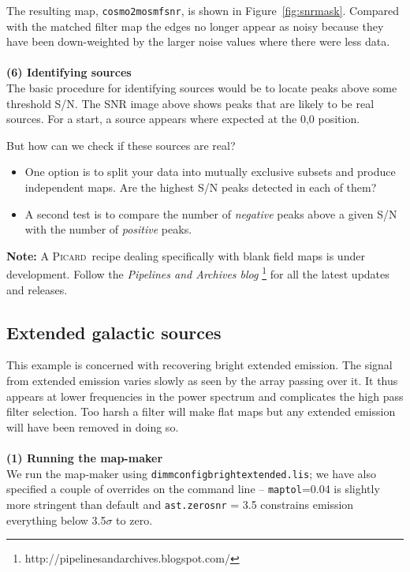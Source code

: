 \documentclass[twoside,11pt]{article}
\newcommand{\htmladdnormallink}[2]{#1}
\newcommand{\htmlref}[2]{#1}
\newcommand{\latex}[1]{#1}
\newcommand{\latexhtml}[2]{#1}
\newcommand{\xref}[3]{#1}
\newcommand{\xlabel}[1]{}
\renewcommand{\_}{\texttt{\symbol{95}}}
\newcommand{\picard}{\xref{\textsc{Picard}}{sun265}{}}
\newcommand{\cref}[3]{\latexhtml{#1~\ref{#2}}{\htmlref{#3}{#2}}}
\begin{document}
The resulting map, \texttt{cosmo2\_mos\_mf\_snr}, is shown in
\cref{Figure}{fig:snrmask}{signal-to-noise image}. Compared with the
matched filter map the
edges no longer appear as noisy because they have been down-weighted
by the larger noise values where there were less data.
\\ \\
\textbf{(6) Identifying sources}\\
The basic procedure for identifying sources would be to locate peaks
above some threshold S/N.  The SNR image above shows peaks that are
likely to be real sources. For a start, a source appears where
expected at the 0,0 position.

But how can we check if these sources are real?
\begin{itemize}

\item One option is to split your data into mutually exclusive subsets
  and produce independent maps. Are the highest S/N peaks detected in each of
  them?
\item A second test is to compare the number of {\em negative} peaks above
  a given S/N with the number of {\em positive} peaks.
\end{itemize}

\textbf{Note:} A \picard\ recipe dealing specifically with blank field
maps is under development. Follow the \htmladdnormallink{\emph{Pipelines and Archives
blog}}{http://pipelinesandarchives.blogspot.com/}
\latex{\footnote{http://pipelinesandarchives.blogspot.com/}} for all the
latest updates and releases.

\subsection{\xlabel{Galactic}Extended galactic sources}
\label{sec:bright_ex}

This example is concerned with recovering bright extended emission.
The signal from extended emission varies slowly as seen by the array
passing over it. It thus appears at lower frequencies in the power
spectrum and complicates the high pass filter selection. Too harsh a
filter will make flat maps but any extended emission will have been
removed in doing so.
\\ \\
\textbf{(1) Running the map-maker}\\
We run the map-maker using \texttt{dimmconfig\_bright\_extended.lis};
we have also specified a couple of overrides on the command line --
\texttt{maptol}=0.04 is slightly more stringent than default and
\texttt{ast.zero\_snr} = 3.5 constrains emission everything below
3.5$\sigma$ to zero.
\end{document}
